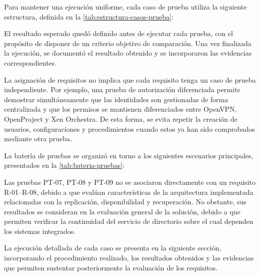 Para mantener una ejecución uniforme, cada caso de prueba utiliza la siguiente estructura, definida en la \autoref{tab:estructura-casos-prueba}:



El resultado esperado quedó definido antes de ejecutar cada prueba, con el propósito de disponer de un criterio objetivo de comparación. Una vez finalizada la ejecución, se documentó el resultado obtenido y se incorporaron las evidencias correspondientes.

La asignación de requisitos no implica que cada requisito tenga un caso de prueba independiente. Por ejemplo, una prueba de autorización diferenciada permite demostrar simultáneamente que las identidades son gestionadas de forma centralizada y que los permisos se mantienen diferenciados entre OpenVPN, OpenProject y Xen Orchestra. De esta forma, se evita repetir la creación de usuarios, configuraciones y procedimientos cuando estos ya han sido comprobados mediante otra prueba.

La batería de pruebas se organizó en torno a los siguientes escenarios principales, presentados en la \autoref{tab:bateria-pruebas}:



Las pruebas PT-07, PT-08 y PT-09 no se asociaron directamente con un requisito R-01--R-08, debido a que evalúan características de la arquitectura implementada relacionadas con la replicación, disponibilidad y recuperación. No obstante, sus resultados se consideran en la evaluación general de la solución, debido a que permiten verificar la continuidad del servicio de directorio sobre el cual dependen los sistemas integrados.

La ejecución detallada de cada caso se presenta en la siguiente sección, incorporando el procedimiento realizado, los resultados obtenidos y las evidencias que permiten sustentar posteriormente la evaluación de los requisitos.
